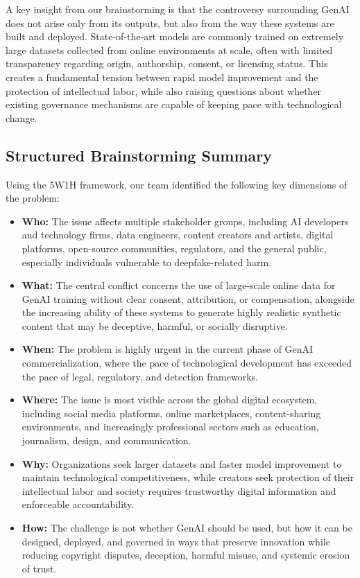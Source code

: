 A key insight from our brainstorming is that the controversy surrounding GenAI does not arise only from its outputs, but also from the way these systems are built and deployed. State-of-the-art models are commonly trained on extremely large datasets collected from online environments at scale, often with limited transparency regarding origin, authorship, consent, or licensing status. This creates a fundamental tension between rapid model improvement and the protection of intellectual labor, while also raising questions about whether existing governance mechanisms are capable of keeping pace with technological change.

\subsection{Structured Brainstorming Summary}
Using the 5W1H framework, our team identified the following key dimensions of the problem:

\begin{itemize}
  \item \textbf{Who:} The issue affects multiple stakeholder groups, including AI developers and technology firms, data engineers, content creators and artists, digital platforms, open-source communities, regulators, and the general public, especially individuals vulnerable to deepfake-related harm.

  \item \textbf{What:} The central conflict concerns the use of large-scale online data for GenAI training without clear consent, attribution, or compensation, alongside the increasing ability of these systems to generate highly realistic synthetic content that may be deceptive, harmful, or socially disruptive.

  \item \textbf{When:} The problem is highly urgent in the current phase of GenAI commercialization, where the pace of technological development has exceeded the pace of legal, regulatory, and detection frameworks.

  \item \textbf{Where:} The issue is most visible across the global digital ecosystem, including social media platforms, online marketplaces, content-sharing environments, and increasingly professional sectors such as education, journalism, design, and communication.

  \item \textbf{Why:} Organizations seek larger datasets and faster model improvement to maintain technological competitiveness, while creators seek protection of their intellectual labor and society requires trustworthy digital information and enforceable accountability.

  \item \textbf{How:} The challenge is not whether GenAI should be used, but how it can be designed, deployed, and governed in ways that preserve innovation while reducing copyright disputes, deception, harmful misuse, and systemic erosion of trust.
\end{itemize}

